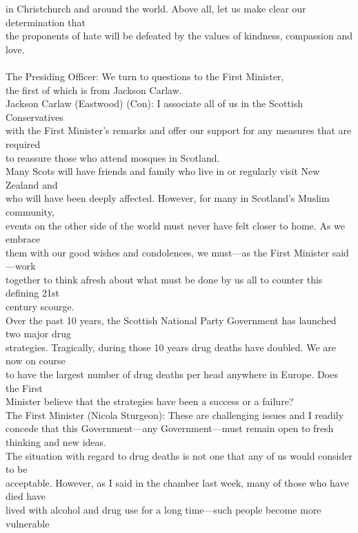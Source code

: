 \documentclass{article}
\begin{document}
\begin{description}
{in Christchurch and around the world. Above all, let us make clear our determination that\\
the proponents of hate will be defeated by the values of kindness, compassion and love.\\
[Applause.]\\
The Presiding Officer: We turn to questions to the First Minister,\\
the first of which is from Jackson Carlaw.\\
Jackson Carlaw (Eastwood) (Con): I associate all of us in the Scottish Conservatives\\
with the First Minister’s remarks and offer our support for any measures that are required\\
to reassure those who attend mosques in Scotland.\\
Many Scots will have friends and family who live in or regularly visit New Zealand and\\
who will have been deeply affected. However, for many in Scotland’s Muslim community,\\
events on the other side of the world must never have felt closer to home. As we embrace\\
them with our good wishes and condolences, we must—as the First Minister said—work\\
together to think afresh about what must be done by us all to counter this defining 21st\\
century scourge.\\
Over the past 10 years, the Scottish National Party Government has launched two major drug\\
strategies. Tragically, during those 10 years drug deaths have doubled. We are now on course\\
to have the largest number of drug deaths per head anywhere in Europe. Does the First\\
Minister believe that the strategies have been a success or a failure?\\
The First Minister (Nicola Sturgeon): These are challenging issues and I readily\\
concede that this Government—any Government—must remain open to fresh thinking and new ideas.\\
The situation with regard to drug deaths is not one that any of us would consider to be\\
acceptable. However, as I said in the chamber last week, many of those who have died have\\
lived with alcohol and drug use for a long time—such people become more vulnerable\\
}
\end{description}
\end{document}
